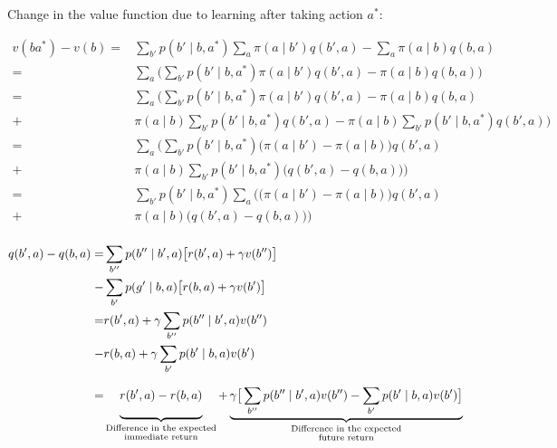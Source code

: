 \documentclass{article}
\begin{document}
    
Change in the value function due to learning after taking action $a^*$:

\begin{align}
v(ba^*)-v(b)=&\sum_{b'}p(b'\mid b, a^*)\sum_a \pi(a\mid b')q(b', a)-\sum_{a} \pi(a\mid b)q(b,a)\\
=&\sum_a\big(\sum_{b'}p(b'\mid b, a^*) \pi(a\mid b')q(b', a)-\pi(a\mid b)q(b,a)\big) \nonumber \\
=&\sum_a\big(\sum_{b'}p(b'\mid b, a^*) \pi(a\mid b')q(b', a)-\pi(a\mid b)q(b,a) \nonumber \\
+&\pi(a\mid b)\sum_{b'}p(b'\mid b, a^*)q(b', a) - \pi(a\mid b)\sum_{b'}p(b'\mid b, a^*)q(b', a)\big) \nonumber \\
=&\sum_a\big(\sum_{b'}p(b'\mid b, a^*)\big(\pi(a\mid b')-\pi(a\mid b)\big)q(b',a) \nonumber \\
+&\pi(a\mid b)\sum_{b'}p(b'\mid b, a^*)\big(q(b', a) - q(b, a)\big)\big)\nonumber \\
=&\sum_{b'}p(b'\mid b, a^*)\sum_a\big(\big(\pi(a\mid b')-\pi(a\mid b)\big)q(b',a) \nonumber \\
+&\pi(a\mid b)\big(q(b', a) - q(b, a)\big)\big)\nonumber \\
\end{align}

\begin{align}
q(b', a)-q(b, a)=&\sum_{b''}p(b''\mid b', a)\big[r(b',a) + \gamma v(b'')\big]\\
-&\sum_{b'}p(g'\mid b, a)\big[r(b,a) + \gamma v(b')\big]\nonumber\\
=& r(b',a) + \gamma \sum_{b''}p(b''\mid b', a)v(b'')\nonumber \\
-& r(b,a) + \gamma \sum_{b'}p(b'\mid b, a)v(b')\nonumber \\
=& \underbrace{\vphantom{ \left(\frac{a^{\frac{0.3}{`}}}{b}\right)} r(b',a) - r(b,a)}_{\substack{\text{Difference in the expected} \\ \text{immediate return}}} + \underbrace{\gamma \big[ \sum_{b''}p(b''\mid b', a)v(b'') - \sum_{b'}p(b'\mid b, a)v(b') \big]}_{\substack{\text{Difference in the expected} \\ \text{future return}}}\nonumber
\end{align}
\end{document}
